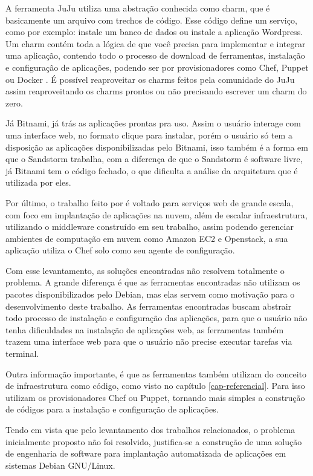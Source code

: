 A ferramenta JuJu utiliza uma abstração conhecida como charm,
que é basicamente um arquivo com trechos de código. Esse código define um serviço, 
como por exemplo: instale um banco de dados ou instale a aplicação Wordpress. Um charm
contém toda a lógica de que você precisa para implementar e integrar uma aplicação,
contendo todo o processo de download de ferramentas, instalação e configuração de
aplicações, podendo ser por provisionadores como Chef, Puppet ou Docker \cite{juju}. 
É possível reaproveitar os charms feitos pela comunidade do JuJu assim
reaproveitando os charms prontos ou não precisando escrever um charm do zero.

Já Bitnami, já trás as aplicações prontas pra uso. Assim o usuário interage com 
uma interface web, no formato clique para instalar, porém
o usuário só tem a disposição as aplicações disponibilizadas pelo Bitnami, isso
também é a forma em que o Sandstorm trabalha, com a diferença de que o Sandstorm é
software livre, já Bitnami tem o código fechado, o que dificulta a análise da arquitetura
que é utilizada por eles. 

Por último, o trabalho feito por \cite{leo2014} é voltado
para serviços web de grande escala, com foco em implantação de aplicações na
nuvem, além  de escalar infraestrutura, utilizando o middleware construído em seu trabalho, 
assim podendo gerenciar ambientes de computação em nuvem como Amazon EC2 e 
Openstack, a sua aplicação utiliza o Chef solo como seu agente de configuração.

Com esse levantamento, as soluções encontradas não resolvem totalmente
o problema. A grande diferença é que as ferramentas encontradas não utilizam os pacotes
disponibilizados pelo Debian, mas elas servem como motivação para o desenvolvimento
deste trabalho. As ferramentas encontradas buscam
abstrair todo processo de instalação e configuração das aplicações, para que o
usuário não tenha dificuldades na instalação de aplicações web, as ferramentas também
trazem uma interface web para que o usuário não precise executar tarefas via terminal.

Outra informação importante, é que as ferramentas também utilizam do conceito de
infraestrutura como código, como visto no capítulo \ref{cap-referencial}. Para
isso utilizam os provisionadores Chef ou Puppet, tornando mais simples a
construção de códigos para a instalação e configuração de aplicações.

Tendo em vista que pelo levantamento dos trabalhos relacionados, o problema inicialmente
proposto não foi resolvido, justifica-se a construção de uma solução de engenharia
de software para implantação automatizada de aplicações em sistemas Debian GNU/Linux.


